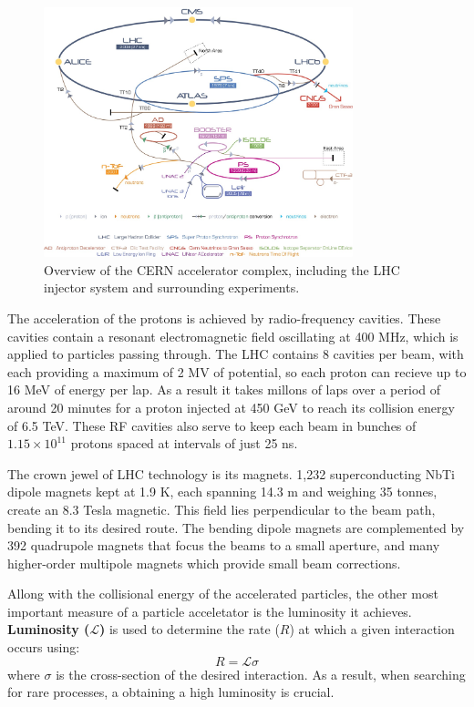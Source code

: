 \begin{figure}[h!]
    \centering
    \includegraphics[width=0.8\textwidth]{Figures/2/cern_complex.png}
    \caption{Overview of the CERN accelerator complex, including the LHC injector system and surrounding experiments.}
    \label{fig:lhc_injector}
\end{figure}

The acceleration of the protons is achieved by radio-frequency cavities. These cavities contain a resonant electromagnetic field oscillating at 400 MHz, which is applied to particles passing through. The LHC contains 8 cavities per beam, with each providing a maximum of 2 MV of potential, so each proton can recieve up to 16 MeV of energy per lap. As a result it takes millons of laps over a period of around 20 minutes for a proton injected at 450 GeV to reach its collision energy of 6.5 TeV.  These RF cavities also serve to keep each beam in bunches of $1.15 \times 10^{11}$ protons spaced at intervals of just 25 ns.

The crown jewel of LHC technology is its magnets. 1,232 superconducting NbTi dipole magnets kept at 1.9 K, each spanning 14.3 m and weighing 35 tonnes, create an 8.3 Tesla magnetic. This field lies perpendicular to the beam path, bending it to its desired route. The bending dipole magnets are complemented by 392 quadrupole magnets that focus the beams to a small aperture, and many higher-order multipole magnets which provide small beam corrections.

Allong with the collisional energy of the accelerated particles, the other most important measure of a particle acceletator is the luminosity it achieves. \textbf{Luminosity ($\mathcal{L}$)} is used to determine the rate ($R$) at which a given interaction occurs using:
\begin{equation}
R = \mathcal{L}\sigma
\end{equation}
where $\sigma$ is the cross-section of the desired interaction. As a result, when searching for rare processes, a obtaining a high luminosity is crucial.

